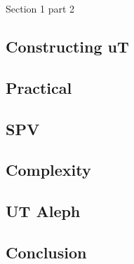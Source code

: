 \documentclass[a4paper]{article}
\begin{document}
\begin{section}{Section 1 part 2}
\subsection{Constructing uT}









\subsection{Practical}

% 

% 

% 


% 


% 
% 
% 
% 

\subsection{SPV}



% 

\subsection{Complexity}

% 

\subsection{UT Aleph}



\clearpage

\section{Conclusion}



%
%

% 
% 

\end{section}

\appendix

% 
\end{document}
